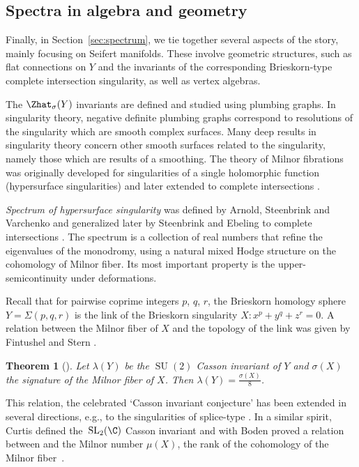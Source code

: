 \documentclass[pdftex]{sigma}
\newtheorem{Theorem}{Theorem}[section]
\begin{document}
\subsection{Spectra in algebra and geometry}

Finally, in Section~\ref{sec:spectrum}, we tie together several aspects of the story, mainly focusing on Seifert manifolds. These involve geometric structures, such as flat connections on $Y$ and the invariants of the corresponding Brieskorn-type complete intersection singularity, as well as vertex algebras.

The $\Zhat_{\sigma}(Y)$ invariants are defined and studied using plumbing graphs. In singularity theory, negative definite plumbing graphs correspond to resolutions of the singularity which are smooth complex surfaces. Many deep results in singularity theory concern other smooth surfaces related to the singularity, namely those which are results of a smoothing. The theory of Milnor fibrations was originally developed for singularities of a single holomorphic function (hypersurface singularities) \cite{Mil69} and later extended to complete intersections \cite{Loo84}.

\emph{Spectrum of hypersurface singularity} \cite{St85} was defined by Arnold, Steenbrink and Varchenko and generalized later by Steenbrink and Ebeling to complete intersections \cite{EbSt98}. The spectrum is a collection of real numbers that refine the eigenvalues of the monodromy, using a natural mixed Hodge structure on the cohomology of Milnor fiber. Its most important property is the upper-semicontinuity under deformations.

Recall that for pairwise coprime integers $p$, $q$, $r$, the Brieskorn homology sphere $Y = \Sigma(p, q, r)$ is the link of the Brieskorn singularity $X\colon x^p+y^q+z^r = 0$. A relation between the Milnor fiber of $X$ and the topology of the link was given by Fintushel and Stern \cite{FS90}.

\begin{Theorem}[{\cite[Theorem 2.10]{FS90}}]\label{thm:FS}
	Let $\lambda(Y)$ be the $\operatorname{SU}(2)$ Casson invariant of $Y$ and $\sigma(X)$ the signature of the Milnor fiber of $X$. Then
$\lambda(Y) = \frac{\sigma(X)}{8}$.
\end{Theorem}
This relation, the celebrated `Casson invariant conjecture' \cite{NeuWa90} has been extended in several directions, e.g., to the singularities of splice-type \cite{NeOk08}. In a similar spirit, Curtis \cite{Cu01} defined the~$\operatorname{SL}_2(\C)$ Casson invariant  and with Boden proved a relation between  and the Milnor number $\mu(X)$, the rank of the cohomology of the Milnor fiber~\cite{BC06}.
\end{document}
